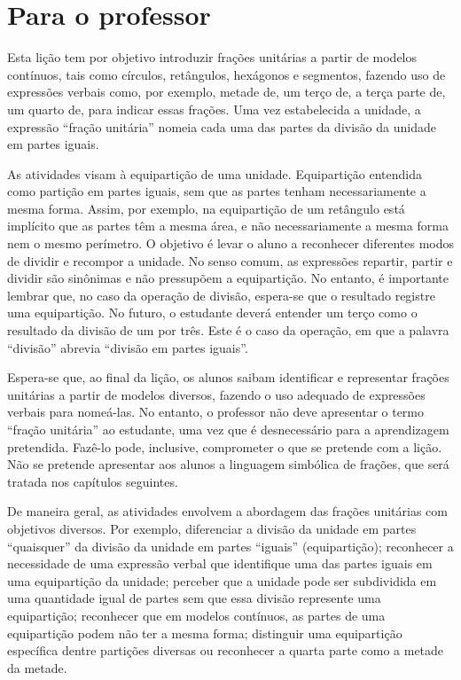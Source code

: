 
\chapter{Para o professor}\label{chap1}

Esta lição tem por objetivo introduzir frações unitárias a partir de modelos contínuos, tais como círculos, retângulos, hexágonos e segmentos, fazendo uso de expressões verbais como, por exemplo, metade de, um terço de, a terça parte de, um quarto de, para indicar essas frações.
Uma vez estabelecida a unidade, a expressão ``fração unitária'' nomeia cada uma das partes da divisão da unidade em partes iguais.

As atividades visam à equipartição de uma unidade. Equipartição entendida como partição em partes iguais, sem que as partes tenham necessariamente a mesma forma. Assim, por exemplo, na equipartição de um retângulo está implícito que as partes têm a mesma área, e não necessariamente a mesma forma nem o mesmo perímetro. O objetivo é levar o aluno a reconhecer diferentes modos de dividir e recompor a unidade. No senso comum, as expressões repartir, partir e dividir são sinônimas e não pressupõem a equipartição. No entanto, é importante lembrar que, no caso da operação de divisão, espera-se que o resultado registre uma equipartição. No futuro, o estudante deverá entender um terço como o resultado da divisão de um por três. Este é o caso da operação, em que a palavra ``divisão'' abrevia ``divisão em partes iguais''.

Espera-se que, ao final da lição, os alunos saibam identificar e representar frações unitárias a partir de modelos  diversos, fazendo o uso adequado de expressões verbais para nomeá-las. No entanto, o professor não deve apresentar o termo ``fração unitária'' ao estudante, uma vez que é desnecessário para a aprendizagem pretendida. Fazê-lo pode, inclusive, comprometer o que se pretende com a lição. Não se pretende apresentar aos alunos a linguagem simbólica de frações, que será tratada nos capítulos seguintes.

De maneira geral, as atividades envolvem a abordagem das frações unitárias com objetivos diversos. Por exemplo, diferenciar a divisão da unidade em partes ``quaisquer'' da divisão da unidade em partes ``iguais'' (equipartição); reconhecer a necessidade de uma expressão verbal que identifique uma das partes iguais em uma equipartição da unidade; perceber que a unidade pode ser subdividida em uma quantidade igual de partes sem que essa divisão represente uma equipartição; reconhecer que em modelos contínuos, as partes de uma equipartição podem não ter a mesma forma; distinguir uma equipartição específica dentre partições diversas ou reconhecer a quarta parte como a metade da metade.

